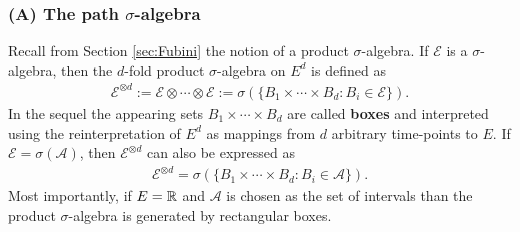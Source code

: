 \subsubsection{(A) The path $\sigma$-algebra}
Recall from Section \ref{sec:Fubini} the notion of a product $\sigma$-algebra. If $\mathcal E$ is a $\sigma$-algebra, then the $d$-fold product $\sigma$-algebra on $E^d$ is defined as 
\begin{align*}
	\mathcal E^{\otimes d}:=\mathcal E\otimes \cdots \otimes \mathcal E:=\sigma(\{B_1\times \cdots \times B_d: B_i\in \mathcal E\}).
\end{align*}
In the sequel the appearing sets $B_1\times \cdots \times B_d$ are called \textbf{boxes} and interpreted using the reinterpretation of $E^d$ as mappings from $d$ arbitrary time-points to $E$. If $\mathcal E=\sigma(\mathcal A)$, then $\mathcal E^{\otimes d}$ can also be expressed as
\begin{align*}
	\mathcal E^{\otimes d}=\sigma(\{B_1\times \cdots \times B_d: B_i\in \mathcal A\}).
\end{align*}
Most importantly, if $E=\mathbb{R}$ and $\mathcal A$ is chosen as the set of intervals than the product $\sigma$-algebra is generated by rectangular boxes.
